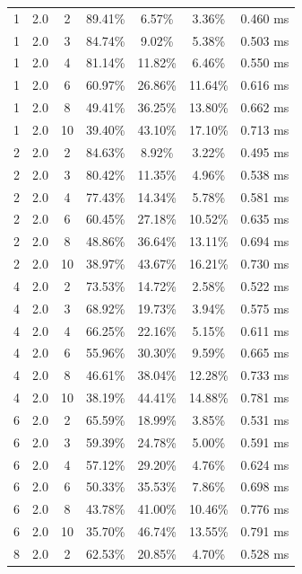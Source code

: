 \documentclass[11pt,a4paper]{article}
\begin{document}
\begin{longtable}{ccccccc}
        1 & 2.0 & 2 & 89.41\% & 6.57\% & 3.36\% & 0.460 ms \\
        1 & 2.0 & 3 & 84.74\% & 9.02\% & 5.38\% & 0.503 ms \\
        1 & 2.0 & 4 & 81.14\% & 11.82\% & 6.46\% & 0.550 ms \\
        1 & 2.0 & 6 & 60.97\% & 26.86\% & 11.64\% & 0.616 ms \\
        1 & 2.0 & 8 & 49.41\% & 36.25\% & 13.80\% & 0.662 ms \\
        1 & 2.0 & 10 & 39.40\% & 43.10\% & 17.10\% & 0.713 ms \\
        \midrule
        2 & 2.0 & 2 & 84.63\% & 8.92\% & 3.22\% & 0.495 ms \\
        2 & 2.0 & 3 & 80.42\% & 11.35\% & 4.96\% & 0.538 ms \\
        2 & 2.0 & 4 & 77.43\% & 14.34\% & 5.78\% & 0.581 ms \\
        2 & 2.0 & 6 & 60.45\% & 27.18\% & 10.52\% & 0.635 ms \\
        2 & 2.0 & 8 & 48.86\% & 36.64\% & 13.11\% & 0.694 ms \\
        2 & 2.0 & 10 & 38.97\% & 43.67\% & 16.21\% & 0.730 ms \\
        \midrule
        4 & 2.0 & 2 & 73.53\% & 14.72\% & 2.58\% & 0.522 ms \\
        4 & 2.0 & 3 & 68.92\% & 19.73\% & 3.94\% & 0.575 ms \\
        4 & 2.0 & 4 & 66.25\% & 22.16\% & 5.15\% & 0.611 ms \\
        4 & 2.0 & 6 & 55.96\% & 30.30\% & 9.59\% & 0.665 ms \\
        4 & 2.0 & 8 & 46.61\% & 38.04\% & 12.28\% & 0.733 ms \\
        4 & 2.0 & 10 & 38.19\% & 44.41\% & 14.88\% & 0.781 ms \\
        \midrule
        6 & 2.0 & 2 & 65.59\% & 18.99\% & 3.85\% & 0.531 ms \\
        6 & 2.0 & 3 & 59.39\% & 24.78\% & 5.00\% & 0.591 ms \\
        6 & 2.0 & 4 & 57.12\% & 29.20\% & 4.76\% & 0.624 ms \\
        6 & 2.0 & 6 & 50.33\% & 35.53\% & 7.86\% & 0.698 ms \\
        6 & 2.0 & 8 & 43.78\% & 41.00\% & 10.46\% & 0.776 ms \\
        6 & 2.0 & 10 & 35.70\% & 46.74\% & 13.55\% & 0.791 ms \\
        \midrule
        8 & 2.0 & 2 & 62.53\% & 20.85\% & 4.70\% & 0.528 ms \\

\end{longtable}
\end{document}
